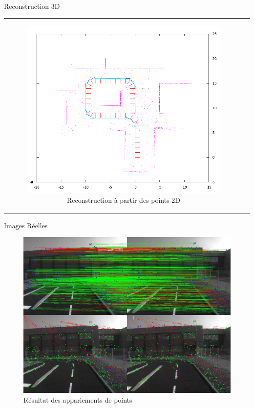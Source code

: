 \documentclass{beamer}
\begin{document}
\begin{frame}{Reconstruction 3D}
\begin{tabular}{c c}
\begin{minipage}{0.5\linewidth}
\begin{figure}
        \includegraphics[width=1.0\linewidth]{images/buildfromvideo.png}
        \caption{Reconstruction à partir des points 2D}
      \end{figure}
    \end{minipage}
  \end{tabular}
\end{frame}

\begin{frame}{Images Réelles}
  \begin{figure}
    \includegraphics[width=0.7\linewidth]{images/result.jpg}
    \caption{Résultat des appariements de points}
  \end{figure}
\end{frame}
\end{document}
